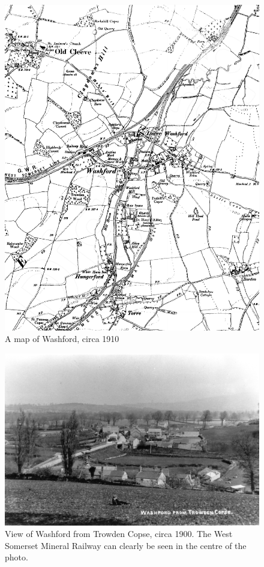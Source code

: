\begin{figure}
     \includegraphics[width=1\textwidth]{figures/WashfordMap1910}
     \caption{A map of Washford, circa 1910}
     \label{fig:Map}
\end{figure}

\begin{figure}[p]
     \includegraphics[width=1\textwidth]{figures/Washford1900s}
     \caption{View of Washford from Trowden Copse, circa 1900. The West Somerset Mineral Railway can clearly be seen in the centre of the photo.}
     \label{fig:WashfordView}
\end{figure}

